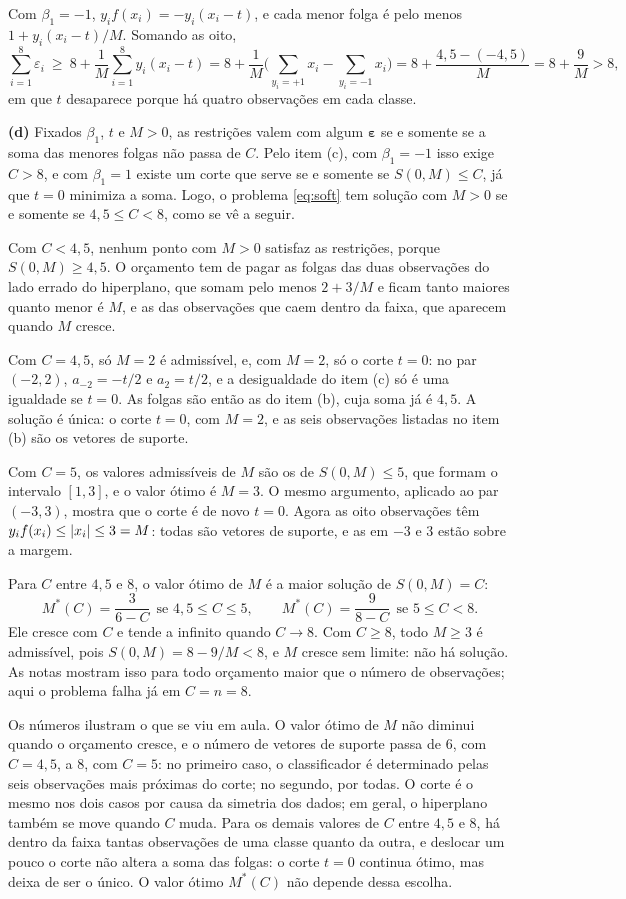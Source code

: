 \documentclass[11pt,a4paper]{article}
\begin{document}
\begin{solucao}
Com $\beta_1=-1$, $y_if(x_i)=-y_i(x_i-t)$, e cada menor folga é pelo menos
$1+y_i(x_i-t)/M$. Somando as oito,
\[
  \sum_{i=1}^8\varepsilon_i\ \ge\ 8+\frac1M\sum_{i=1}^8y_i(x_i-t)
  =8+\frac1M\Big(\sum_{y_i=+1}x_i-\sum_{y_i=-1}x_i\Big)
  =8+\frac{4{,}5-(-4{,}5)}{M}=8+\frac9M>8,
\]
em que $t$ desaparece porque há quatro observações em cada classe.

\smallskip
\textbf{(d)} Fixados $\beta_1$, $t$ e $M>0$, as restrições valem com algum
$\bm\varepsilon$ se e somente se a soma das menores folgas não passa de $C$. Pelo item
(c), com $\beta_1=-1$ isso exige $C>8$, e com $\beta_1=1$ existe um corte que serve
se e somente se $S(0,M)\le C$, já que $t=0$ minimiza a soma. Logo, o problema
\eqref{eq:soft} tem solução com $M>0$ se e somente se $4{,}5\le C<8$, como se vê a
seguir.

Com $C<4{,}5$, nenhum ponto com $M>0$ satisfaz as restrições, porque
$S(0,M)\ge4{,}5$. O orçamento tem de pagar as folgas das duas observações do lado
errado do hiperplano, que somam pelo menos $2+3/M$ e ficam tanto maiores quanto menor é
$M$, e as das observações que caem dentro da faixa, que aparecem quando $M$ cresce.

Com $C=4{,}5$, só $M=2$ é admissível, e, com $M=2$, só o corte $t=0$: no par
$(-2,2)$, $a_{-2}=-t/2$ e $a_2=t/2$, e a desigualdade do item (c) só é uma igualdade se
$t=0$. As folgas são então as do item (b), cuja soma já é $4{,}5$. A solução é única:
o corte $t=0$, com $M=2$, e as seis observações listadas no item (b) são os vetores de
suporte.

Com $C=5$, os valores admissíveis de $M$ são os de $S(0,M)\le5$, que formam o
intervalo $[1,3]$, e o valor ótimo é $M=3$. O mesmo argumento, aplicado ao par
$(-3,3)$, mostra que o corte é de novo $t=0$. Agora as oito observações têm
$y_if(x_i)\le\left\lvert x_i \right\rvert\le3=M$: todas são vetores de suporte, e as em $-3$ e $3$ estão
sobre a margem.

Para $C$ entre $4{,}5$ e $8$, o valor ótimo de $M$ é a maior solução de $S(0,M)=C$:
\[
  M^\ast(C)=\frac{3}{6-C}\ \ \text{se }4{,}5\le C\le5,
  \qquad
  M^\ast(C)=\frac{9}{8-C}\ \ \text{se }5\le C<8 .
\]
Ele cresce com $C$ e tende a infinito quando $C\to8$. Com $C\ge8$, todo $M\ge3$ é
admissível, pois $S(0,M)=8-9/M<8$, e $M$ cresce sem limite: não há solução. As notas
mostram isso para todo orçamento maior que o número de observações; aqui o problema
falha já em $C=n=8$.

Os números ilustram o que se viu em aula. O valor ótimo de $M$ não diminui quando o
orçamento cresce, e o número de vetores de suporte passa de $6$, com $C=4{,}5$, a $8$,
com $C=5$: no primeiro caso, o classificador é determinado pelas seis observações mais
próximas do corte; no segundo, por todas. O corte é o mesmo nos dois casos por causa
da simetria dos dados; em geral, o hiperplano também se move quando $C$ muda. Para os
demais valores de $C$ entre $4{,}5$ e $8$, há dentro da faixa tantas observações de
uma classe quanto da outra, e deslocar um pouco o corte não altera a soma das folgas:
o corte $t=0$ continua ótimo, mas deixa de ser o único. O valor ótimo $M^\ast(C)$ não
depende dessa escolha.


\end{solucao}
\end{document}
